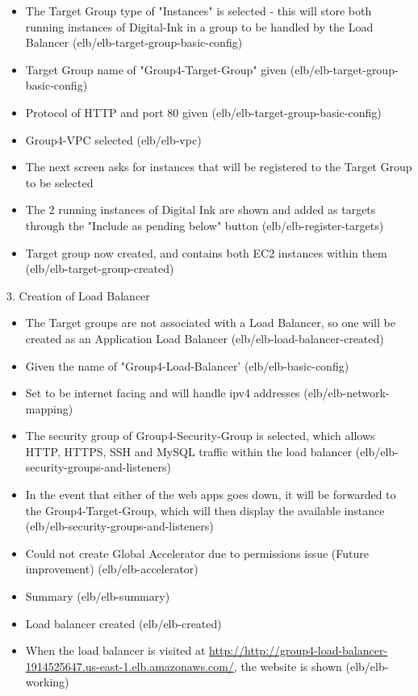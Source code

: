 \begin{itemize}
    \item The Target Group type of "Instances" is selected - this will store both running instances of Digital-Ink in a group
    to be handled by the Load Balancer (elb/elb-target-group-basic-config)
    \item Target Group name of "Group4-Target-Group" given (elb/elb-target-group-basic-config)
    \item Protocol of HTTP and port 80 given (elb/elb-target-group-basic-config)
    \item Group4-VPC selected (elb/elb-vpc)
    \item The next screen asks for instances that will be registered to the Target Group to be selected
    \item The 2 running instances of Digital Ink are shown and added as targets through the "Include as pending below"
    button (elb/elb-register-targets)
    \item Target group now created, and contains both EC2 instances within them (elb/elb-target-group-created)
\end{itemize}

3. Creation of Load Balancer

\begin{itemize}
    \item The Target groups are not associated with a Load Balancer, so one will be created as an Application Load Balancer
    (elb/elb-load-balancer-created)
    \item Given the name of "Group4-Load-Balancer' (elb/elb-basic-config)
    \item Set to be internet facing and will handle ipv4 addresses (elb/elb-network-mapping)
    \item The security group of Group4-Security-Group is selected, which allows HTTP, HTTPS, SSH and MySQL traffic within
    the load balancer (elb/elb-security-groups-and-listeners)
    \item In the event that either of the web apps goes down, it will be forwarded to the Group4-Target-Group, which will then
    display the available instance (elb/elb-security-groups-and-listeners)
    \item Could not create Global Accelerator due to permissions issue (Future improvement) (elb/elb-accelerator)
    \item Summary (elb/elb-summary)
    \item Load balancer created (elb/elb-created)
    \item When the load balancer is visited at
    \href{http://http://group4-load-balancer-1914525647.us-east-1.elb.amazonaws.com/}{http://http://group4-load-balancer-1914525647.us-east-1.elb.amazonaws.com/},
    the website is shown (elb/elb-working)
\end{itemize}

